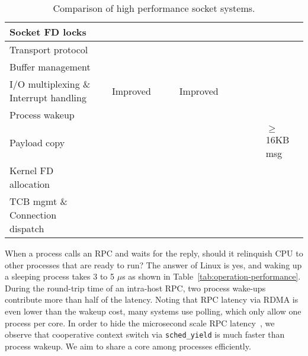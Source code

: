 \begin{table*}[t]
{\begin{tabularx}{1.45\textwidth}{l|X|X|X|X|X|X|X|X|X|X|}
			\hline
			Socket FD locks & & & & & & & & & & \yes \\
			\hline
			Transport protocol & & & & & & & & \yes & \yes & \yes \\
			\hline
			Buffer management & & & & & & & & & & \yes \\
			\hline
			I/O multiplexing \& Interrupt handling & & Improved & \yes & \yes & Improved & \yes & \yes & \yes & \yes & \yes \\
			\hline
			Process wakeup & & & & & & & & & & \yes \\
			\hline
			Payload copy & & \yes & & & \yes & & & & & $\ge$16KB msg \\
			\hline
			Kernel FD allocation & & \yes &  &  & \yes & & & & & \yes \\
			\hline
			TCB mgmt \& Connection dispatch & \yes & \yes & \yes & \yes & \yes & & & & & \yes \\
			\hline
		\end{tabularx}
	}
	\caption{Comparison of high performance socket systems.}
	\label{tab:related-work}
	\vspace{-20pt}
\end{table*}




When a process calls an RPC and waits for the reply, should it relinquish CPU to other processes that are ready to run?
The answer of Linux is yes, and waking up a sleeping process takes 3 to 5 $\mu$s as shown in Table~\ref{tab:operation-performance}.
During the round-trip time of an intra-host RPC, two process wake-ups contribute more than half of the latency.
Noting that RPC latency via RDMA is even lower than the wakeup cost, many systems use polling, which only allow one process per core.
In order to hide the microsecond scale RPC latency~\cite{barroso2017attack}, we observe that cooperative context switch via \texttt{sched\_yield} is much faster than process wakeup.
We aim to share a core among processes efficiently.



